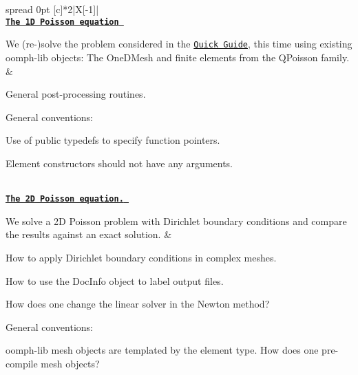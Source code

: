 \begin{longtabu} spread 0pt [c]{*{2}{|X[-1]}|}
\hline
{}\\
\href{../../poisson/one_d_poisson/html/index.html}{\tt {\bfseries  The 1D Poisson equation }}

We (re-\/)solve the problem considered in the \href{../../quick_guide/html/index.html}{\tt Quick Guide}, this time using existing {\ttfamily oomph-\/lib} objects\+: The {\ttfamily One\+D\+Mesh} and finite elements from the {\ttfamily Q\+Poisson} family.  &
\begin{DoxyItemize}
\item General post-\/processing routines.
\item General conventions\+:
\begin{DoxyItemize}
\item Use of public typedefs to specify function pointers.
\item Element constructors should not have any arguments.
\end{DoxyItemize}
\end{DoxyItemize}

\\
\href{../../poisson/two_d_poisson/html/index.html}{\tt {\bfseries  The 2D Poisson equation. }}

We solve a 2D Poisson problem with Dirichlet boundary conditions and compare the results against an exact solution.  &
\begin{DoxyItemize}
\item How to apply Dirichlet boundary conditions in complex meshes.
\item How to use the {\ttfamily Doc\+Info} object to label output files.
\item How does one change the linear solver in the Newton method?
\item General conventions\+:
\begin{DoxyItemize}
\item {\ttfamily oomph-\/lib} mesh objects are templated by the element type. How does one pre-\/compile mesh objects? 
\end{DoxyItemize}
\end{DoxyItemize}


\end{longtabu}
